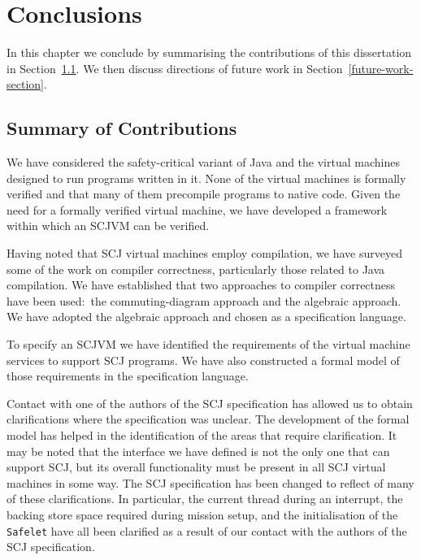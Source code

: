 \chapter{Conclusions}
\label{conclusions-chapter}
In this chapter we conclude by summarising the contributions of this
dissertation in Section~\ref{summary-section}.
We then discuss directions of future work in
Section~\ref{future-work-section}.

\section{Summary of Contributions}
\label{summary-section}

We have considered the safety-critical variant of Java and the virtual machines designed to run
programs written in it.
None of the virtual machines is formally verified and that many of
them precompile programs to native code.
Given the need for a formally verified virtual machine, we have
developed a framework within which an SCJVM can be verified.

Having noted that SCJ virtual machines employ compilation, we have
surveyed some of the work on compiler correctness, particularly those
related to Java compilation.
We have established that two approaches to compiler correctness have
been used:~the commuting-diagram approach and the algebraic approach.
We have adopted the algebraic approach and chosen \Circus{} as a
specification language.

To specify an SCJVM we have identified the requirements of the virtual
machine services to support SCJ programs.
We have also constructed a formal model of those requirements in the
\Circus{} specification language.

Contact with one of the authors of the SCJ specification has allowed
us to obtain clarifications where the specification was unclear.
The development of the formal model has helped in the identification
of the areas that require clarification.
It may be noted that the interface we have defined is not the only one
that can support SCJ, but its overall functionality must be present in
all SCJ virtual machines in some way.
The SCJ specification has been changed to reflect of many of these
clarifications.
In particular, the current thread during an interrupt, the backing
store space required during mission setup, and the initialisation of
the \texttt{Safelet} have all been clarified as a result of our
contact with the authors of the SCJ specification.

